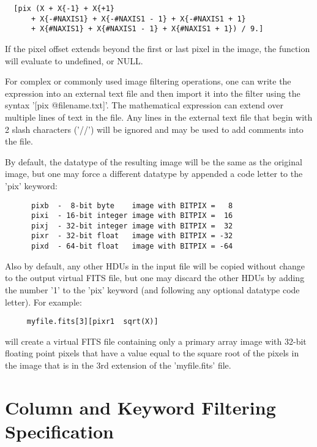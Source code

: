 \documentclass[11pt]{book}
\begin{document}
\begin{verbatim}
  [pix (X + X{-1} + X{+1}
      + X{-#NAXIS1} + X{-#NAXIS1 - 1} + X{-#NAXIS1 + 1}
      + X{#NAXIS1} + X{#NAXIS1 - 1} + X{#NAXIS1 + 1}) / 9.]
\end{verbatim}
If the pixel offset
extends beyond the first or last pixel in the image, the function will
evaluate to undefined, or NULL.

For  complex  or commonly used image filtering operations,
one  can  write the expression into an external text  file and
then import it  into the
filter using  the syntax '[pix @filename.txt]'.   The mathematical
expression can
extend over multiple lines of text in the  file.
Any lines in the external text file
that begin with 2 slash characters ('//') will be ignored and may be
used to add comments into the file.

By default, the datatype of the resulting image will be the same as
the original image, but one may force a different datatype by appended
a code letter to the 'pix' keyword:

\begin{verbatim}
      pixb  -  8-bit byte    image with BITPIX =   8
      pixi  - 16-bit integer image with BITPIX =  16
      pixj  - 32-bit integer image with BITPIX =  32
      pixr  - 32-bit float   image with BITPIX = -32
      pixd  - 64-bit float   image with BITPIX = -64
\end{verbatim}
Also by default, any other HDUs in the input file will be copied without
change to the
output virtual FITS file, but one may discard the other HDUs by adding
the number '1' to the 'pix' keyword (and following any optional datatype code
letter).  For example:

\begin{verbatim}
     myfile.fits[3][pixr1  sqrt(X)]
\end{verbatim}
will create a virtual FITS file containing only a primary array image
with 32-bit floating point pixels that have a value equal to the square
root of the pixels in the image that is in the 3rd extension
of the 'myfile.fits' file.



\section{Column and Keyword Filtering Specification}
\end{document}
